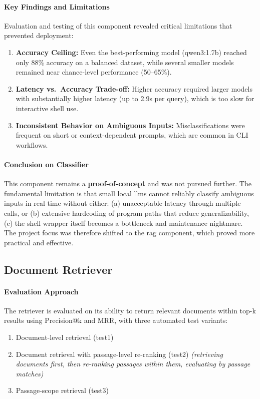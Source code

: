 \paragraph{Key Findings and Limitations}
Evaluation and testing of this component revealed critical limitations that
prevented deployment:

\begin{enumerate}
  \item \textbf{Accuracy Ceiling:} Even the best-performing model
    (qwen3:1.7b) reached only 88\% accuracy on a balanced dataset, while several
    smaller models remained near chance-level performance (50--65\%).
  \item \textbf{Latency vs.\ Accuracy Trade-off:} Higher accuracy required
    larger models with substantially higher latency (up to 2.9s per query),
    which is too slow for interactive shell use.
  \item \textbf{Inconsistent Behavior on Ambiguous Inputs:} Misclassifications
    were frequent on short or context-dependent prompts, which are common in
    CLI workflows.
\end{enumerate}

\paragraph{Conclusion on Classifier}
This component remains a \textbf{proof-of-concept} and was not
pursued further. The fundamental limitation is that small local
\glspl{llm} cannot reliably classify ambiguous inputs in real-time
without either: (a) unacceptable latency through multiple calls, or
(b) extensive hardcoding of program paths that reduce
generalizability, (c) the shell wrapper itself becomes a bottleneck
and maintenance nightmare. The project focus was therefore shifted to
the \gls{rag} component, which proved more practical and effective.

\subsection{Document Retriever}

\paragraph{Evaluation Approach}
The retriever is evaluated on its ability to return relevant documents within
top-k results using Precision@k and MRR, with three automated test variants:
\begin{enumerate}
  \item Document-level retrieval (test1)
  \item Document retrieval with passage-level re-ranking (test2)
      \textit{(retrieving documents first, then re-ranking passages within them, evaluating by passage matches)}
  \item Passage-scope retrieval (test3)
\end{enumerate}

